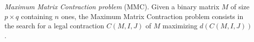 \begin{problem}
	\emph{Maximum Matrix Contraction problem} (MMC). Given a binary matrix $M$ of size $p \times q$ containing $n$ ones, the Maximum Matrix Contraction problem consists in the search for a legal contraction $C(M,I,J)$ of $M$ maximizing $d(C(M,I,J))$.
\end{problem}

\begin{comment}
Doit-on parler du programme mathématique trivial ici?
\end{comment}



